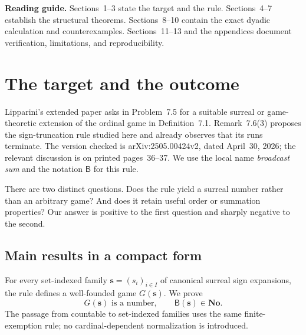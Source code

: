 \documentclass[11pt,letterpaper]{article}
\theoremstyle{definition}
\theoremstyle{remark}
\newcommand{\No}{\mathbf{No}}
\newcommand{\BB}{\mathsf B}
\newcommand{\bs}{\boldsymbol{s}}
\begin{document}
\hypersetup{pageanchor=true}
\setcounter{tocdepth}{1}
\tableofcontents
\vspace{1.3em}
\noindent\textbf{Reading guide.} Sections~1--3 state the target and the rule.
Sections~4--7 establish the structural theorems. Sections~8--10 contain the
exact dyadic calculation and counterexamples. Sections~11--13 and the appendices
document verification, limitations, and reproducibility.
\newpage
{}

\section{The target and the outcome}\label{sec:target}

Lipparini's extended paper \cite{lipparini2026} asks in Problem~7.5 for a suitable
surreal or game-theoretic extension of the ordinal game in Definition~7.1.
Remark~7.6(3) proposes the sign-truncation rule studied here and already observes
that its runs terminate. The version checked is arXiv:2505.00424v2, dated
April~30, 2026; the relevant discussion is on printed pages~36--37.
We use the local name \emph{broadcast sum} and the notation $\BB$ for this rule.

There are two distinct questions. Does the rule yield a surreal number rather
than an arbitrary game? And does it retain useful order or summation properties?
Our answer is positive to the first question and sharply negative to the second.

\subsection{Main results in a compact form}

For every set-indexed family $\bs=(s_i)_{i\in I}$ of canonical surreal sign
expansions, the rule defines a well-founded game $G(\bs)$. We prove
\begin{equation}\label{eq:main-number}
                     G(\bs)\text{ is a number},\qquad \BB(\bs)\in\No.
\end{equation}
The passage from countable to set-indexed families uses the same finite-exemption
rule; no cardinal-dependent normalization is introduced.
\end{document}
